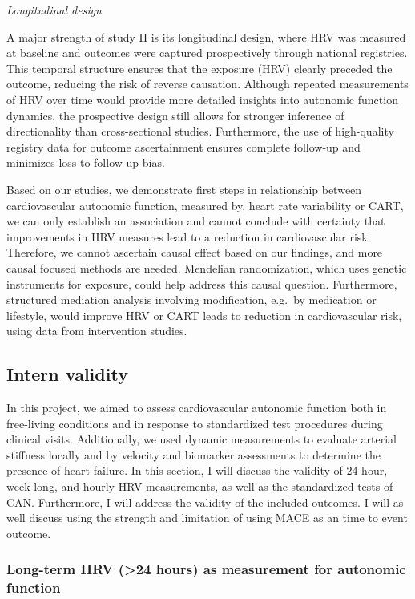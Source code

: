 \documentclass[
  a4paper,
  headsepline=true,
  open=any]{scrbook}
\begin{document}
\emph{Longitudinal design}

A major strength of study II is its longitudinal design, where HRV was
measured at baseline and outcomes were captured prospectively through
national registries. This temporal structure ensures that the exposure
(HRV) clearly preceded the outcome, reducing the risk of reverse
causation. Although repeated measurements of HRV over time would provide
more detailed insights into autonomic function dynamics, the prospective
design still allows for stronger inference of directionality than
cross-sectional studies. Furthermore, the use of high-quality registry
data for outcome ascertainment ensures complete follow-up and minimizes
loss to follow-up bias.

Based on our studies, we demonstrate first steps in relationship between
cardiovascular autonomic function, measured by, heart rate variability
or CART, we can only establish an association and cannot conclude with
certainty that improvements in HRV measures lead to a reduction in
cardiovascular risk. Therefore, we cannot ascertain causal effect based
on our findings, and more causal focused methods are needed. Mendelian
randomization, which uses genetic instruments for exposure, could help
address this causal question. Furthermore, structured mediation analysis
involving modification, e.g.~by medication or lifestyle, would improve
HRV or CART leads to reduction in cardiovascular risk, using data from
intervention studies.

\hypertarget{intern-validity}{%
\subsection{Intern validity}\label{intern-validity}}

In this project, we aimed to assess cardiovascular autonomic function
both in free-living conditions and in response to standardized test
procedures during clinical visits. Additionally, we used dynamic
measurements to evaluate arterial stiffness locally and by velocity and
biomarker assessments to determine the presence of heart failure. In
this section, I will discuss the validity of 24-hour, week-long, and
hourly HRV measurements, as well as the standardized tests of CAN.
Furthermore, I will address the validity of the included outcomes. I
will as well discuss using the strength and limitation of using MACE as
an time to event outcome.

\hypertarget{long-term-hrv-24-hours-as-measurement-for-autonomic-function}{%
\subsubsection{Long-term HRV (\textgreater24 hours) as measurement for
autonomic
function}\label{long-term-hrv-24-hours-as-measurement-for-autonomic-function}}
\end{document}
